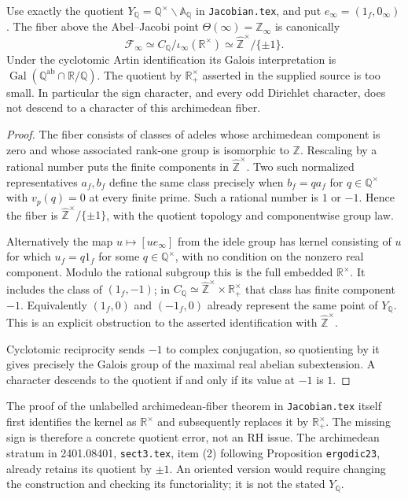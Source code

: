 \begin{proposition}
\label{AC-G13}
Use exactly the quotient
$Y_{\mathbb Q}=\mathbb Q^\times\backslash\mathbb A_{\mathbb Q}$
in \texttt{Jacobian.tex}, and put $e_\infty=(1_f,0_\infty)$.
The fiber above the Abel--Jacobi point
$\Theta(\infty)=\mathbb Z_\infty$ is canonically
\[
 \mathcal F_\infty
 \simeq C_{\mathbb Q}/\iota_\infty(\mathbb R^\times)
 \simeq\widehat{\mathbb Z}^{\times}/\{\pm1\}.
\]
Under the cyclotomic Artin identification its Galois interpretation is
$\operatorname{Gal}(\mathbb Q^{\mathrm{ab}}\cap\mathbb R/\mathbb Q)$.
The quotient by $\mathbb R_+^\times$ asserted in the supplied source is
too small.  In particular the sign character, and every odd Dirichlet
character, does not descend to a character of this archimedean fiber.
\end{proposition}
\begin{proof}
The fiber consists of classes of adeles whose archimedean component is
zero and whose associated rank-one group is isomorphic to $\mathbb Z$.
Rescaling by a rational number puts the finite components in
$\widehat{\mathbb Z}^{\times}$.  Two such normalized representatives
$a_f,b_f$ define the same class precisely when $b_f=q a_f$ for
$q\in\mathbb Q^\times$ with $v_p(q)=0$ at every finite prime.
Such a rational number is $1$ or $-1$.  Hence the fiber is
$\widehat{\mathbb Z}^{\times}/\{\pm1\}$, with the quotient topology
and componentwise group law.

Alternatively the map $u\mapsto[u e_\infty]$ from the idele group has
kernel consisting of $u$ for which $u_f=q1_f$ for some
$q\in\mathbb Q^\times$, with no condition on the nonzero real
component.  Modulo the rational subgroup this is the full embedded
$\mathbb R^\times$.  It includes the class of $(1_f,-1)$; in
$C_{\mathbb Q}\simeq\widehat{\mathbb Z}^{\times}\times
\mathbb R_+^\times$ that class has finite component $-1$.
Equivalently $(1_f,0)$ and $(-1_f,0)$ already represent the same point
of $Y_{\mathbb Q}$.  This is an explicit obstruction to the asserted
identification with $\widehat{\mathbb Z}^{\times}$.

Cyclotomic reciprocity sends $-1$ to complex conjugation, so quotienting
by it gives precisely the Galois group of the maximal real abelian
subextension.  A character descends to the quotient if and only if its
value at $-1$ is $1$.
\end{proof}

\begin{remark}
The proof of the unlabelled archimedean-fiber theorem in
\texttt{Jacobian.tex} itself first identifies the kernel as
$\mathbb R^\times$ and subsequently replaces it by
$\mathbb R_+^\times$.  The missing sign is therefore a concrete
quotient error, not an RH issue.  The archimedean stratum in
2401.08401, \texttt{sect3.tex}, item (2) following Proposition
\texttt{ergodic23}, already retains its quotient by $\pm1$.
An oriented version would require changing the construction and
checking its functoriality; it is not the stated $Y_{\mathbb Q}$.
\end{remark}


